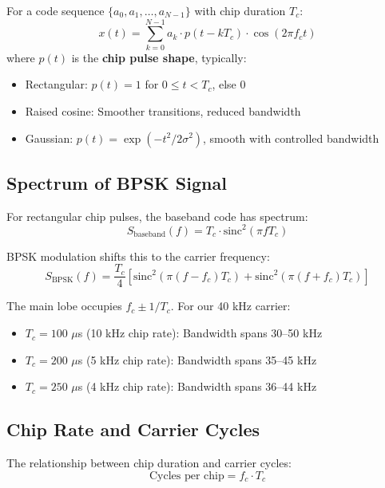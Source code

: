 \documentclass[11pt]{article}
\begin{document}
For a code sequence $\{a_0, a_1, \ldots, a_{N-1}\}$ with chip duration $T_c$:
\begin{equation}
x(t) = \sum_{k=0}^{N-1} a_k \cdot p(t - kT_c) \cdot \cos(2\pi f_c t)
\end{equation}
where $p(t)$ is the \textbf{chip pulse shape}, typically:
\begin{itemize}
    \item Rectangular: $p(t) = 1$ for $0 \leq t < T_c$, else 0
    \item Raised cosine: Smoother transitions, reduced bandwidth
    \item Gaussian: $p(t) = \exp(-t^2/2\sigma^2)$, smooth with controlled bandwidth
\end{itemize}

\subsection{Spectrum of BPSK Signal}

For rectangular chip pulses, the baseband code has spectrum:
\begin{equation}
S_{\text{baseband}}(f) = T_c \cdot \text{sinc}^2(\pi f T_c)
\end{equation}

BPSK modulation shifts this to the carrier frequency:
\begin{equation}
S_{\text{BPSK}}(f) = \frac{T_c}{4}\left[\text{sinc}^2(\pi (f - f_c) T_c) + \text{sinc}^2(\pi (f + f_c) T_c)\right]
\end{equation}

The main lobe occupies $f_c \pm 1/T_c$. For our 40 kHz carrier:
\begin{itemize}
    \item $T_c = 100$ $\mu$s (10 kHz chip rate): Bandwidth spans 30--50 kHz
    \item $T_c = 200$ $\mu$s (5 kHz chip rate): Bandwidth spans 35--45 kHz
    \item $T_c = 250$ $\mu$s (4 kHz chip rate): Bandwidth spans 36--44 kHz
\end{itemize}

\subsection{Chip Rate and Carrier Cycles}

The relationship between chip duration and carrier cycles:
\begin{equation}
\text{Cycles per chip} = f_c \cdot T_c
\end{equation}
\end{document}
